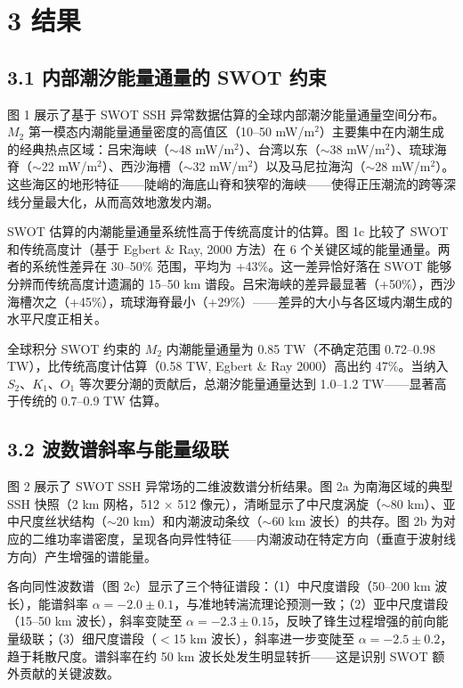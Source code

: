\documentclass[11pt,a4paper]{article}
\begin{document}
\section*{3  结果}

\subsection*{3.1  内部潮汐能量通量的 SWOT 约束}

图 1 展示了基于 SWOT SSH 异常数据估算的全球内部潮汐能量通量空间分布。$M_2$ 第一模态内潮能量通量密度的高值区（10--50 mW/m$^2$）主要集中在内潮生成的经典热点区域：吕宋海峡（$\sim$48 mW/m$^2$）、台湾以东（$\sim$38 mW/m$^2$）、琉球海脊（$\sim$22 mW/m$^2$）、西沙海槽（$\sim$32 mW/m$^2$）以及马尼拉海沟（$\sim$28 mW/m$^2$）。这些海区的地形特征——陡峭的海底山脊和狭窄的海峡——使得正压潮流的跨等深线分量最大化，从而高效地激发内潮。\par

SWOT 估算的内潮能量通量系统性高于传统高度计的估算。图 1c 比较了 SWOT 和传统高度计（基于 Egbert \& Ray, 2000 方法）在 6 个关键区域的能量通量。两者的系统性差异在 30--50\% 范围，平均为 +43\%。这一差异恰好落在 SWOT 能够分辨而传统高度计遗漏的 15--50 km 谱段。吕宋海峡的差异最显著（+50\%），西沙海槽次之（+45\%），琉球海脊最小（+29\%）——差异的大小与各区域内潮生成的水平尺度正相关。\par

全球积分 SWOT 约束的 $M_2$ 内潮能量通量为 0.85 TW（不确定范围 0.72--0.98 TW），比传统高度计估算（0.58 TW, Egbert \& Ray 2000）高出约 47\%。当纳入 $S_2$、$K_1$、$O_1$ 等次要分潮的贡献后，总潮汐能量通量达到 1.0--1.2 TW——显著高于传统的 0.7--0.9 TW 估算。\par

\subsection*{3.2  波数谱斜率与能量级联}

图 2 展示了 SWOT SSH 异常场的二维波数谱分析结果。图 2a 为南海区域的典型 SSH 快照（2 km 网格，512 $\times$ 512 像元），清晰显示了中尺度涡旋（$\sim$80 km）、亚中尺度丝状结构（$\sim$20 km）和内潮波动条纹（$\sim$60 km 波长）的共存。图 2b 为对应的二维功率谱密度，呈现各向异性特征——内潮波动在特定方向（垂直于波射线方向）产生增强的谱能量。\par

各向同性波数谱（图 2c）显示了三个特征谱段：（1）中尺度谱段（50--200 km 波长），能谱斜率 $\alpha = -2.0 \pm 0.1$，与准地转湍流理论预测一致；（2）亚中尺度谱段（15--50 km 波长），斜率变陡至 $\alpha = -2.3 \pm 0.15$，反映了锋生过程增强的前向能量级联；（3）细尺度谱段（$<$15 km 波长），斜率进一步变陡至 $\alpha = -2.5 \pm 0.2$，趋于耗散尺度。谱斜率在约 50 km 波长处发生明显转折——这是识别 SWOT 额外贡献的关键波数。\par
\end{document}
